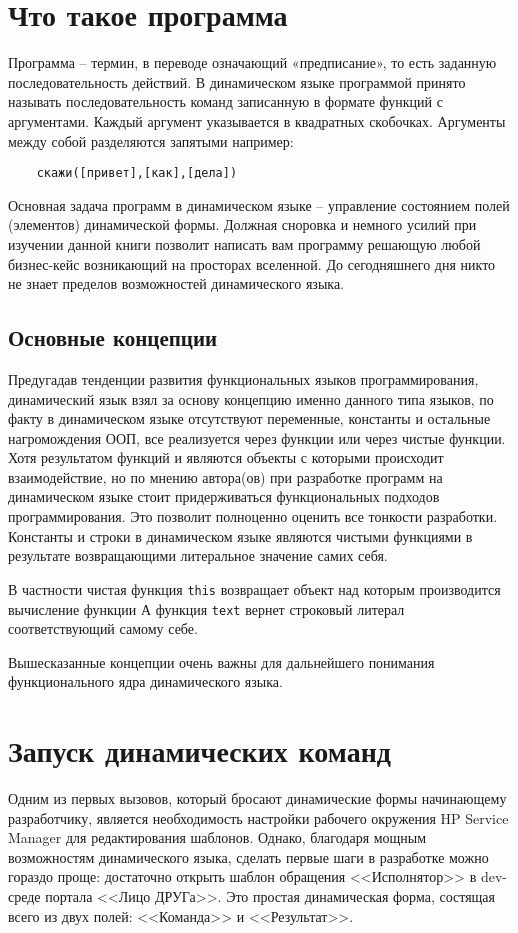 \documentclass[../index.tex]{subfiles}
\begin{document}
\section{Что такое программа}
    Программа -- термин, в переводе означающий «предписание», то есть заданную последовательность действий. В динамическом языке программой принято называть последовательность команд записанную в формате функций с аргументами.
    Каждый аргумент указывается в квадратных скобочках. Аргументы между собой разделяются запятыми например: 
    \begin{verbatim}
    скажи([привет],[как],[дела])
    \end{verbatim}
    Основная задача программ в динамическом языке -- управление состоянием полей (элементов) динамической формы.
    Должная сноровка и немного усилий при изучении данной книги позволит написать вам программу решающую любой бизнес-кейс возникающий на просторах вселенной. До сегодняшнего дня никто не знает пределов возможностей динамического языка.

    \subsection{Основные концепции}
        Предугадав тенденции развития функциональных языков программирования, динамический язык взял за основу концепцию именно данного типа языков, по факту в динамическом языке отсутствуют переменные, константы и остальные нагромождения ООП, все реализуется через функции или через чистые функции. Хотя результатом функций и являются объекты с которыми происходит взаимодействие, но по мнению автора(ов) при разработке программ на динамическом языке стоит придерживаться функциональных подходов программирования. Это позволит полноценно оценить все тонкости разработки.
        Константы и строки в динамическом языке являются чистыми функциями в результате возвращающими литеральное значение самих себя.
                
        В частности чистая функция \texttt{this} возвращает объект над которым производится вычисление функции
        А функция \texttt{text} вернет строковый литерал соответствующий самому себе.
        
        Вышесказанные концепции очень важны для дальнейшего понимания функционального ядра динамического языка.

	\section{Запуск динамических команд}
	Одним из первых вызовов, который бросают динамические формы начинающему разработчику, является необходимость настройки рабочего окружения HP Service Manager для редактирования шаблонов. Однако, благодаря мощным возможностям динамического языка, сделать первые шаги в разработке можно гораздо проще: достаточно открыть шаблон обращения <<Исполнятор>> в dev-среде портала <<Лицо ДРУГа>>. Это простая динамическая форма, состящая всего из двух полей: <<Команда>> и <<Результат>>.
	
\end{document}
